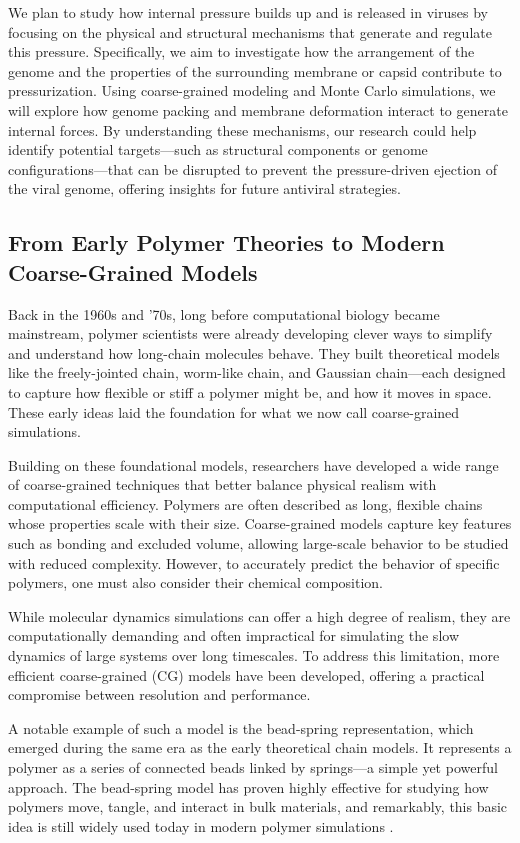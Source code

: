 \documentclass[12pt]{article}
\begin{document}
\begin{flushleft}
We plan to study how internal pressure builds up and is released in viruses by focusing on the physical and structural mechanisms that generate and regulate this pressure. Specifically, we aim to investigate how the arrangement of the genome and the properties of the surrounding membrane or capsid contribute to pressurization. Using coarse-grained modeling and Monte Carlo simulations, we will explore how genome packing and membrane deformation interact to generate internal forces. By understanding these mechanisms, our research could help identify potential targets—such as structural components or genome configurations—that can be disrupted to prevent the pressure-driven ejection of the viral genome, offering insights for future antiviral strategies.

\vspace{-1em}
\subsection*{From Early Polymer Theories to Modern Coarse-Grained Models}
Back in the 1960s and '70s, long before computational biology became mainstream, polymer scientists were already developing clever ways to simplify and understand how long-chain molecules behave. They built theoretical models like the freely-jointed chain, worm-like chain, and Gaussian chain—each designed to capture how flexible or stiff a polymer might be, and how it moves in space. These early ideas laid the foundation for what we now call coarse-grained simulations.

Building on these foundational models, researchers have developed a wide range of coarse-grained techniques that better balance physical realism with computational efficiency. Polymers are often described as long, flexible chains whose properties scale with their size. Coarse-grained models capture key features such as bonding and excluded volume, allowing large-scale behavior to be studied with reduced complexity. However, to accurately predict the behavior of specific polymers, one must also consider their chemical composition.

While molecular dynamics simulations can offer a high degree of realism, they are computationally demanding and often impractical for simulating the slow dynamics of large systems over long timescales. To address this limitation, more efficient coarse-grained (CG) models have been developed, offering a practical compromise between resolution and performance.

A notable example of such a model is the bead-spring representation, which emerged during the same era as the early theoretical chain models. It represents a polymer as a series of connected beads linked by springs—a simple yet powerful approach. The bead-spring model has proven highly effective for studying how polymers move, tangle, and interact in bulk materials, and remarkably, this basic idea is still widely used today in modern polymer simulations \cite{Kremer1990}.
	







\end{flushleft}
\end{document}
